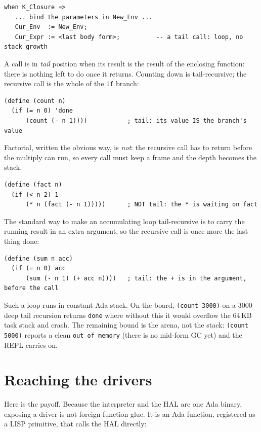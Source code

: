 \begin{lstlisting}
when K_Closure =>
   ... bind the parameters in New_Env ...
   Cur_Env  := New_Env;
   Cur_Expr := <last body form>;          -- a tail call: loop, no stack growth
\end{lstlisting}

A call is in \emph{tail} position when its result is the result of the enclosing
function: there is nothing left to do once it returns. Counting down is
tail-recursive; the recursive call is the whole of the \texttt{if} branch:

\begin{lstlisting}
(define (count n)
  (if (= n 0) 'done
      (count (- n 1))))           ; tail: its value IS the branch's value
\end{lstlisting}

Factorial, written the obvious way, is \emph{not}: the recursive call has to return
before the multiply can run, so every call must keep a frame and the depth becomes
the stack.

\begin{lstlisting}
(define (fact n)
  (if (< n 2) 1
      (* n (fact (- n 1)))))      ; NOT tail: the * is waiting on fact
\end{lstlisting}

The standard way to make an accumulating loop tail-recursive is to carry the running
result in an extra argument, so the recursive call is once more the last thing done:

\begin{lstlisting}
(define (sum n acc)
  (if (= n 0) acc
      (sum (- n 1) (+ acc n))))   ; tail: the + is in the argument, before the call
\end{lstlisting}

Such a loop runs in constant Ada stack. On the board,
\texttt{(count 3000)} on a 3000-deep tail recursion returns \texttt{done} where
without this it would overflow the 64\,KB task stack and crash. The remaining bound
is the arena, not the stack: \texttt{(count 5000)} reports a clean
\texttt{out of memory} (there is no mid-form GC yet) and the REPL carries on.

\section{Reaching the drivers}

Here is the payoff. Because the interpreter and the HAL are one Ada binary, exposing
a driver is not foreign-function glue. It is an Ada function, registered as a LISP
primitive, that calls the HAL directly:

